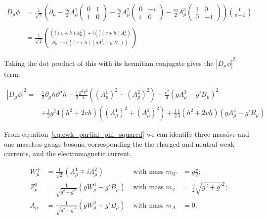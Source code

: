 \begin{equation}\label{eq:ewk_covariant_derivative_acting_on_phi}
\begin{aligned}
D_{\mu}\phi & = \frac{1}{\sqrt{2}}\left( \partial_{\mu}
  - \frac{ig}{2}A_{\mu}^{1} 
  \begin{pmatrix}
    0  &  1 \\
    1  &  0
  \end{pmatrix}
  - \frac{ig}{2}A_{\mu}^{2} 
  \begin{pmatrix}
    0  & -i \\
    i  &  0
  \end{pmatrix}
  - \frac{ig}{2}A_{\mu}^{3} 
  \begin{pmatrix}
    1  &   0 \\
    0  & -1
  \end{pmatrix}
\right)\binom{0}{v+h} \\ \\
& = \frac{1}{\sqrt{2}}\binom{(\frac{g}{2}(v+h)A_{\mu}^{2}) +
  i(\frac{g}{2}(v+h)A_{\mu}^{1})}{\partial_{\mu} +
  i(\frac{1}{2}(v+h)(gA_{\mu}^{3}-g'B_{\mu}))}
\end{aligned}
\end{equation}

\noindent Taking the dot product of this with its hermitian conjugate
gives the $|D_{\mu}\phi|^{2}$ term:

\begin{equation}\label{eq:ewk_partial_phi_squared}
\begin{aligned}
|D_{\mu}\phi|^{2} = & \frac{1}{2}\partial_{\mu}h\partial^{\mu}h +
\frac{1}{2}\frac{g^{2}v^{2}}{4}( (A_{\mu}^{1})^{2} + (A_{\mu}^{2})^{2}
) +\frac{v^{2}}{4}(gA_{\mu}^{3}-g'B_{\mu})^{2}  \\
 & + \frac{1}{2}{g^{2}}{4}(h^{2}+2vh)( (A_{\mu}^{1})^{2} +
 (A_{\mu}^{2})^{2} ) +
 \frac{1}{2}\frac{1}{4}(h^{2}+2vh)(gA_{\mu}^{3}-g'B_{\mu}) 
\end{aligned}
\end{equation}

\noindent From equation~\ref{eq:ewk_partial_phi_squared} we
can identify three massive and one massless gauge bosons,
corresponding the the charged and neutral weak currents, and the
electromagnetic current.  

\begin{equation}\label{eq:ewk_boson_masses}
\begin{aligned}
W_{\mu}^{\pm} & = \frac{1}{\sqrt{2}}(A_{\mu}^{1} \mp iA_{\mu}^{2}) 
&\text{  with mass  }  m_{W} &= g\frac{v}{2}\text{;} \\
Z_{\mu}^{0} & = \frac{1}{\sqrt{g^{2}+g'^{2}}}(gW_{\mu}^{3}-g'B_{\mu})  
&\text{  with mass  }  m_{Z} &= \frac{v}{2}\sqrt{g^{2}+g'^{2}}\text{;}  \\
A_{\mu} & = \frac{1}{\sqrt{g^{2}+g'^{2}}}(gW_{\mu}^{3}+g'B_{\mu}) 
&\text{  with mass  }  m_{A} &= 0 \text{;} 
\end{aligned}
\end{equation}

